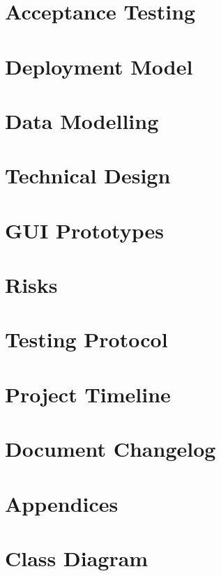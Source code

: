 \documentclass{article}
\begin{document}
	\section{Acceptance Testing}
	
	\pagebreak
	
	\section{Deployment Model}
	
	\pagebreak
	
	\section{Data Modelling}
	
	\pagebreak
	
	\section{Technical Design}
	
	\pagebreak
	
	\section{GUI Prototypes}
	
	\pagebreak
	
	\section{Risks}
	
	\pagebreak
	
	\section{Testing Protocol}
	
	\pagebreak
	
	\section{Project Timeline}
	
	\pagebreak
	
	\section{Document Changelog}
	
	\pagebreak
	
	\appendix
	\section*{Appendices}
	\section{Class Diagram}
\end{document}
